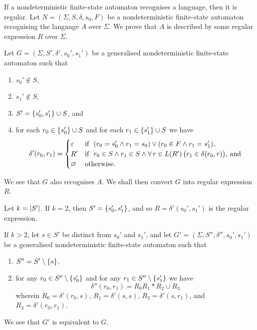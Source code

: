 \Blm
    \label{lem2}
    If a nondeterministic finite-state automaton recognises a language, then it
    is regular.
\Elm
\Bpr
    Let \(N = (\varSigma, S, \delta, s_0, F)\) be a nondeterministic
    finite-state automaton recognising the language \(A\) over \(\varSigma\). We
    prove that \(A\) is described by some regular expression \(R\) over
    \(\varSigma\).

    Let \(G = (\varSigma, S', \delta', s_0', s_1')\) be a generalised
    nondeterministic finite-state automaton such that
    \begin{enumerate}
        \item \(s_0' \not\in S\),
        \item \(s_1' \not\in S\),
        \item \(S' = \{s_0', s_1'\} \cup S\), and
        \item for each \(r_0 \in \{s_0'\} \cup S\) and for each \(r_1 \in
        \{s_1'\} \cup S\) we have
            \[
                \delta'(r_0, r_1) = \begin{cases}
                        \varepsilon & \text{if }\ (r_0 = s_0' \land r_1 = s_0)
                        \lor (r_0 \in F \land r_1 = s_1'),\\
                        R' & \text{if }\ r_0 \in S \land r_1 \in S \land \forall
                        \, r \in L(R') \, \big(r_1 \in \delta(r_0, r)\big)
                        \text{, and}\\
                        \varnothing & \text{otherwise.}
                    \end{cases}
            \]
    \end{enumerate}
    We see that \(G\) also recognises \(A\). We shall then convert \(G\) into
    regular expression \(R\).

    Let \(k = \lvert S'\rvert\). If \(k = 2\), then \(S' = \{s_0', s_1'\}\), and
    so \(R = \delta'(s_0', s_1')\) is the regular expression.

    If \(k > 2\), let \(s \in S'\) be distinct from \(s_0'\) and \(s_1'\), and
    let \(G' = (\varSigma, S'', \delta'', s_0', s_1')\) be a generalised
    nondeterministic finite-state automaton such that
    \begin{enumerate}
        \item \(S'' = S' \setminus \{s\}\),
        \item for any \(r_0 \in S'' \setminus \{s_0'\}\) and for any \(r_1
        \in S'' \setminus \{s_1'\}\) we have
        \[
            \delta''(r_0, r_1) = R_0 R_1 * R_2 \cup R_3
        \]
        wherein \(R_0 = \delta'(r_0, s)\), \(R_1 = \delta'(s, s)\), \(R_2 =
        \delta'(s, r_1)\), and \(R_3 = \delta'(r_0, r_1)\).
    \end{enumerate}
    We see that \(G'\) is equivalent to \(G\).

